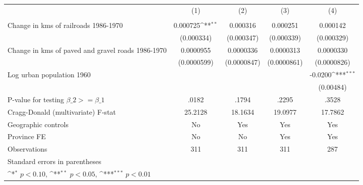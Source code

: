{
\def\sym#1{\ifmmode^{#1}\else\(^{#1}\)\fi}
\begin{tabular}{l*{4}{c}}
\hline\hline
                &\multicolumn{1}{c}{(1)}&\multicolumn{1}{c}{(2)}&\multicolumn{1}{c}{(3)}&\multicolumn{1}{c}{(4)}\\
                &\multicolumn{1}{c}{}&\multicolumn{1}{c}{}&\multicolumn{1}{c}{}&\multicolumn{1}{c}{}\\
\hline
Change in kms of railroads 1986-1970& 0.000725\sym{**} & 0.000316         & 0.000251         & 0.000142         \\
                &(0.000334)         &(0.000347)         &(0.000339)         &(0.000329)         \\
[1em]
Change in kms of paved and gravel roads 1986-1970&0.0000955         &0.0000336         &0.0000313         &0.0000330         \\
                &(0.0000599)         &(0.0000847)         &(0.0000861)         &(0.0000826)         \\
[1em]
Log urban population 1960&                  &                  &                  &  -0.0200\sym{***}\\
                &                  &                  &                  &(0.00484)         \\
\hline
P-value for testing $\beta\_{2} >= \beta\_{1}$&    .0182         &    .1794         &    .2295         &    .3528         \\
Cragg-Donald (multivariate) F-stat&  25.2128         &  18.1634         &  19.0977         &  17.7862         \\
Geographic controls&       No         &      Yes         &      Yes         &      Yes         \\
Province FE     &       No         &       No         &      Yes         &      Yes         \\
Observations    &      311         &      311         &      311         &      287         \\
\hline\hline
\multicolumn{5}{l}{\footnotesize Standard errors in parentheses}\\
\multicolumn{5}{l}{\footnotesize \sym{*} \(p<0.10\), \sym{**} \(p<0.05\), \sym{***} \(p<0.01\)}\\
\end{tabular}
}
